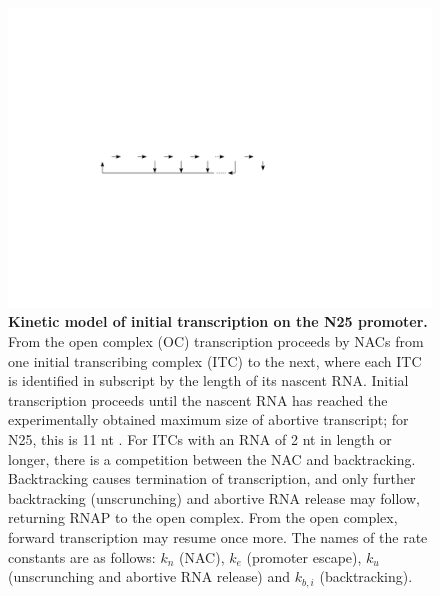 \begin{figure}[h]
    \begin{center}
      \includegraphics{../illustrations/model_and_rates_mini}
    \end{center}
  \caption{{\bf Kinetic model of initial transcription on the N25 promoter.}
    From the open complex (OC) transcription proceeds by NACs from one initial
    transcribing complex (ITC) to the next, where each ITC is identified in
    subscript by the length of its nascent RNA. Initial transcription proceeds
    until the nascent RNA has reached the experimentally obtained maximum size
    of abortive transcript; for N25, this is 11 nt \cite{hsu_initial_2006}.
    For ITCs with an RNA of 2 nt in length or longer, there is a competition
    between the NAC and backtracking. Backtracking causes termination of
    transcription, and only further backtracking (unscrunching) and abortive
    RNA release may follow, returning RNAP to the open complex. From the open
    complex, forward transcription may resume once more. The names of the rate
    constants are as follows: $k_n$ (NAC), $k_e$ (promoter escape), $k_u$
    (unscrunching and abortive RNA release) and $k_{b,i}$ (backtracking).}
    \label{fig:model_and_rates}
\end{figure}

